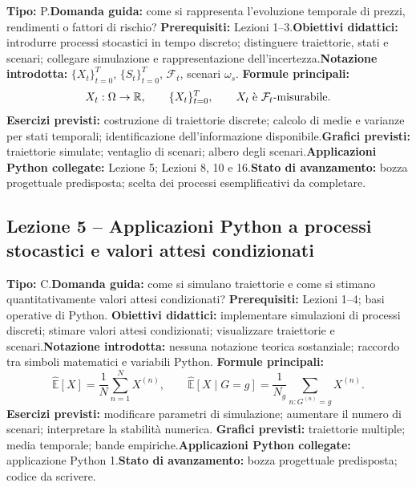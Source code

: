 \documentclass[12pt,a4paper]{article}%
\begin{document}
\textbf{Tipo:} P.\newline\textbf{Domanda guida:} come si rappresenta
l'evoluzione temporale di prezzi, rendimenti o fattori di rischio?\newline%
\textbf{Prerequisiti:} Lezioni 1--3.\newline\textbf{Obiettivi didattici:}
introdurre processi stocastici in tempo discreto; distinguere traiettorie,
stati e scenari; collegare simulazione e rappresentazione
dell'incertezza.\newline\textbf{Notazione introdotta:} $\{X_{t}\}_{t=0}^{T}$,
$\{S_{t}\}_{t=0}^{T}$, $\mathcal{F}_{t}$, scenari $\omega_{s}$.\newline%
\textbf{Formule principali:}
\[
X_{t}:\Omega\rightarrow\mathbb{R}, \qquad\{X_{t}\}_{t=0}^{T}, \qquad X_{t} \;
\hbox{\`{e} } \mathcal{F}_{t}\hbox{-misurabile}.
\]
\textbf{Esercizi previsti:} costruzione di traiettorie discrete; calcolo di
medie e varianze per stati temporali; identificazione dell'informazione
disponibile.\newline\textbf{Grafici previsti:} traiettorie simulate; ventaglio
di scenari; albero degli scenari.\newline\textbf{Applicazioni Python
collegate:} Lezione 5; Lezioni 8, 10 e 16.\newline\textbf{Stato di
avanzamento:} bozza progettuale predisposta; scelta dei processi
esemplificativi da completare.

\subsection{Lezione 5 -- Applicazioni Python a processi stocastici e valori
attesi condizionati}

\textbf{Tipo:} C.\newline\textbf{Domanda guida:} come si simulano traiettorie
e come si stimano quantitativamente valori attesi condizionati?\newline%
\textbf{Prerequisiti:} Lezioni 1--4; basi operative di Python.\newline%
\textbf{Obiettivi didattici:} implementare simulazioni di processi discreti;
stimare valori attesi condizionati; visualizzare traiettorie e
scenari.\newline\textbf{Notazione introdotta:} nessuna notazione teorica
sostanziale; raccordo tra simboli matematici e variabili Python.\newline%
\textbf{Formule principali:}
\[
\widehat{\mathbb{E}}[X]=\frac{1}{N}\sum_{n=1}^{N}X^{(n)}, \qquad
\widehat{\mathbb{E}}[X\mid G=g]=\frac{1}{N_{g}}\sum_{n:G^{(n)}=g}X^{(n)}.
\]
\textbf{Esercizi previsti:} modificare parametri di simulazione; aumentare il
numero di scenari; interpretare la stabilit\`{a} numerica.\newline%
\textbf{Grafici previsti:} traiettorie multiple; media temporale; bande
empiriche.\newline\textbf{Applicazioni Python collegate:} applicazione Python
1.\newline\textbf{Stato di avanzamento:} bozza progettuale predisposta; codice
da scrivere.
\end{document}
